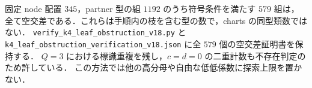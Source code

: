 固定 node 配置 $345$，partner 型の組 $1192$ のうち符号条件を満たす $579$ 組は，
全て空交差である．これらは手順内の枝を含む型の数で，charts の同型類数ではない．
\nolinkurl{verify_k4_leaf_obstruction_v18.py} と
\nolinkurl{k4_leaf_obstruction_verification_v18.json} に全 $579$ 個の空交差証明書を保持する．
$Q=3$ における標識重複を残し，$c=d=0$ の二重計数も不存在判定のため許している．
この方法では他の高分母や自由な低低係数に探索上限を置かない．
